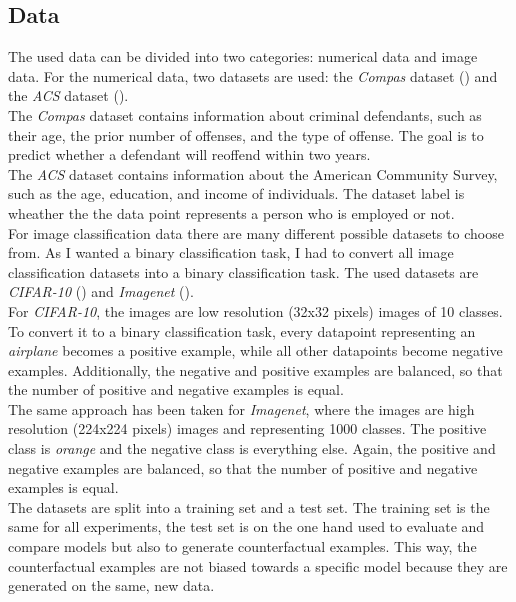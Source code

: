 \documentclass{article}
\begin{document}
\subsection{Data}
The used data can be divided into two categories: numerical data and image data. For the numerical data, two datasets are used: the \textit{Compas} dataset (\cite{compas_dataset}) and the \textit{ACS} dataset (\cite{acs_dataset}). \\
The \textit{Compas} dataset contains information about criminal defendants, such as their age, the prior number of offenses, and the type of offense. The goal is to predict whether a defendant will reoffend within two years. \\
The \textit{ACS} dataset contains information about the American Community Survey, such as the age, education, and income of individuals. The dataset label is wheather the the data point represents a person who is employed or not. \\
For image classification data there are many different possible datasets to choose from. As I wanted a binary classification task, I had to convert all image classification datasets into a binary classification task. The used datasets are \textit{CIFAR-10} (\cite{cifar10_dataset}) and \textit{Imagenet} (\cite{imagenet_dataset}). \\
For \textit{CIFAR-10}, the images are low resolution (32x32 pixels) images of 10 classes. To convert it to a binary classification task, every datapoint representing an \textit{airplane} becomes a positive example, while all other datapoints become negative examples. Additionally, the negative and positive examples are balanced, so that the number of positive and negative examples is equal.\\
The same approach has been taken for \textit{Imagenet}, where the images are high resolution (224x224 pixels) images and representing 1000 classes. The positive class is \textit{orange} and the negative class is everything else. Again, the positive and negative examples are balanced, so that the number of positive and negative examples is equal.\\
The datasets are split into a training set and a test set. The training set is the same for all experiments, the test set is on the one hand used to evaluate and compare models but also to generate counterfactual examples. This way, the counterfactual examples are not biased towards a specific model because they are generated on the same, new data. 
\end{document}
